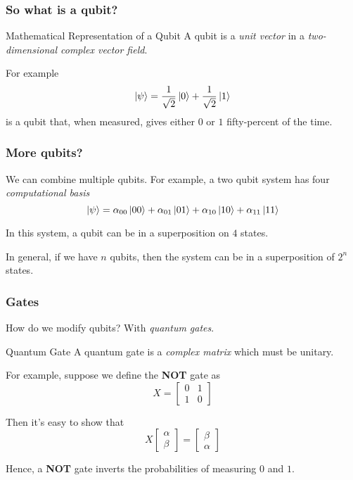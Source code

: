 \documentclass{beamer}
\begin{document}
  \begin{frame}
    \frametitle{So what is a qubit?}
    \begin{block}{Mathematical Representation of a Qubit}
      A qubit is a \textit{unit vector} in a \textit{two-dimensional complex vector field}.
    \end{block}

    For example
    \begin{equation*}
      \ket\psi = \frac1{\sqrt 2}\ket0 + \frac1{\sqrt 2}\ket1
    \end{equation*}
    is a qubit that, when measured, gives either $0$ or $1$ fifty-percent of the time.
  \end{frame}
  \begin{frame}
    \frametitle{More qubits?}
    We can combine multiple qubits. For example, a two qubit system has four \textit{computational basis}
    \begin{equation*}
      \ket\psi = \alpha_{00}\ket{00} + \alpha_{01}\ket{01} + \alpha_{10}\ket{10} + \alpha_{11}\ket{11}
    \end{equation*}

    In this system, a qubit can be in a superposition on $4$ states.

    In general, if we have $n$ qubits, then the system can be in a superposition of $2^n$ states.
  \end{frame}
  \begin{frame}
    \frametitle{Gates}
    How do we modify qubits? With \textit{quantum gates}.
    \begin{block}{Quantum Gate}
      A quantum gate is a \textit{complex matrix} which must be unitary.
    \end{block}

    For example, suppose we define the \textbf{NOT} gate as
    \begin{equation*}
      X = \begin{bmatrix}
        0 & 1 \\ 1 & 0
      \end{bmatrix}
    \end{equation*}

    Then it's easy to show that
    \begin{equation*}
      X\begin{bmatrix}
        \alpha \\ \beta
      \end{bmatrix}
      = \begin{bmatrix}
        \beta \\ \alpha
      \end{bmatrix}
    \end{equation*}

    Hence, a \textbf{NOT} gate inverts the probabilities of measuring $0$ and $1$.
  \end{frame}
\end{document}
